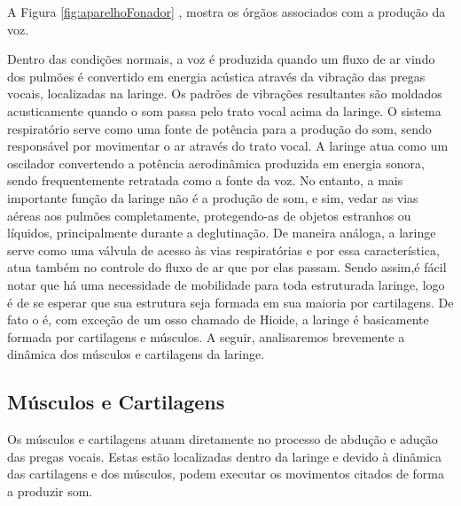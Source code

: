 	A Figura \ref{fig:aparelhoFonador} , mostra os órgãos associados com a produção da voz. 
	
	Dentro das condições normais, a voz é produzida quando um ﬂuxo de ar vindo dos pulmões é convertido em energia acústica através da vibração das pregas vocais, localizadas na laringe. Os padrões de vibrações resultantes são moldados acusticamente quando o som passa pelo trato vocal acima da laringe. O sistema respiratório serve como uma
	fonte de potência para a produção do som, sendo responsável por movimentar o ar através do trato vocal. A laringe atua como um oscilador convertendo a potência aerodinâmica produzida em energia sonora, sendo frequentemente retratada como a fonte da voz. No entanto, a mais importante função da laringe não é a produção de som, e sim, vedar as vias aéreas aos pulmões completamente, protegendo-as de objetos estranhos ou líquidos, principalmente durante a deglutinação. De maneira análoga, a laringe serve como uma válvula de acesso às vias respiratórias e por essa característica, atua também no controle do ﬂuxo de ar que por elas passam. Sendo assim,é fácil notar que há uma necessidade de mobilidade para toda estruturada laringe, logo é de se esperar que sua estrutura seja formada em sua maioria por cartilagens. De fato o é, com exceção de um osso chamado de Hioide, a laringe é basicamente formada por cartilagens e músculos. A seguir, analisaremos brevemente a dinâmica dos músculos e cartilagens da laringe.
	
\subsection{Músculos e Cartilagens}
Os músculos e cartilagens atuam diretamente no processo de abdução e adução das pregas vocais. Estas estão localizadas dentro da laringe e devido à dinâmica das cartilagens e dos músculos, podem executar os movimentos citados de forma a produzir som.

